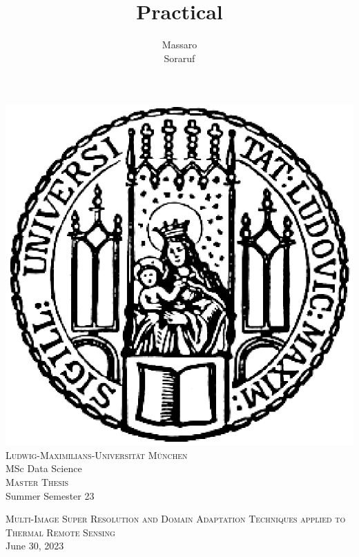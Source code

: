 \documentclass[11pt]{article}
\title{Practical}
\author{Massaro\\ Soraruf}
\numberwithin{figure}{section}
\numberwithin{table}{section}
\begin{document}
\pagestyle{fancy}
\renewcommand{\sectionmark}[1]{\markboth{}{\thesection\ \ #1}}
\lhead{}
\chead{}
\rhead{\rightmark}
\lfoot{}
\cfoot{}
\rfoot{\thepage}

%
%
\begin{titlepage}

\thispagestyle{empty}

\begin{center}
\includegraphics[scale=0.5]{Includes/0-siegel.eps}\\
\large{\textsc{Ludwig-Maximilians-Universität München}}\\
\large{MSc Data Science }\\
{\textsc{Master Thesis}} \\ 
\vspace{0.5cm}
\small{Summer Semester 23 }
\end{center}

\vspace{2cm}


\begin{center}
\Large{\textsc{ Multi-Image Super Resolution and Domain Adaptation Techniques applied to Thermal Remote Sensing}} \\
June 30, 2023
\end{center}

\vspace{2cm}


\end{titlepage}
\end{document}
